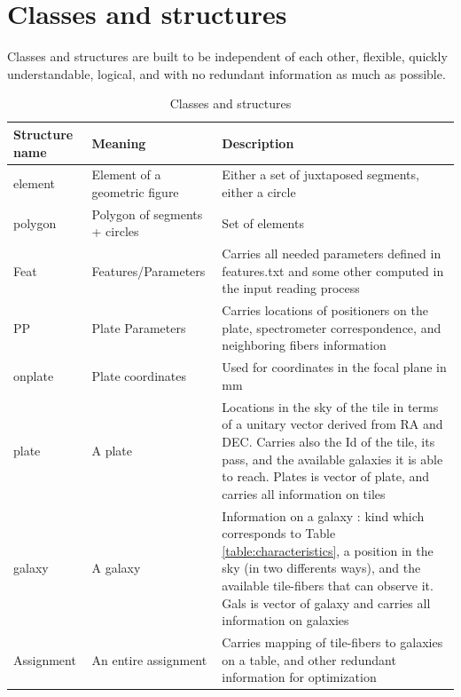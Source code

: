 \documentclass{article}
\begin{document}
\section{Classes and structures}
Classes and structures are built to be independent of each other, flexible, quickly understandable, logical, and with no redundant information as much as possible.

\begin{table}[H]\begin{center}
	\begin{tabular}{|l|l|p{11cm}|} \hline
		Structure name & Meaning & Description \\ \hline \hline

		element & Element of a geometric figure & Either a set of juxtaposed segments, either a circle\\ 

		polygon & Polygon of segments + circles & Set of elements\\ \hline

		Feat & Features/Parameters & Carries all needed parameters defined in features.txt and some other computed in the input reading process\\ \hline

		PP & Plate Parameters & Carries locations of positioners on the plate, spectrometer correspondence, and neighboring fibers information\\ 

		onplate & Plate coordinates & Used for coordinates in the focal plane in mm\\ 

		plate & A plate & Locations in the sky of the tile in terms of a unitary vector derived from RA and DEC. Carries also the Id of the tile, its pass, and the available galaxies it is able to reach. Plates is vector of plate, and carries all information on tiles\\ \hline

		galaxy & A galaxy & Information on a galaxy : kind which corresponds to Table \ref{table:characteristics}, a position in the sky (in two differents ways), and the available tile-fibers that can observe it. Gals is vector of galaxy and carries all information on galaxies\\ \hline

		Assignment & An entire assignment & Carries mapping of tile-fibers to galaxies on a table, and other redundant information for optimization\\ \hline
	\end{tabular}\end{center}
	\caption{Classes and structures}\label{tab:structures}
\end{table}
\end{document}
